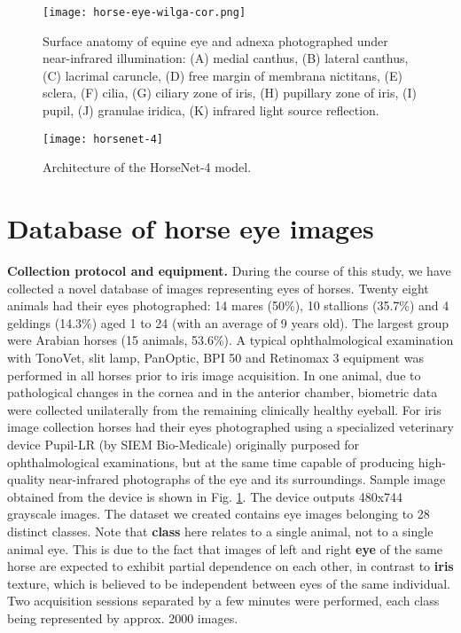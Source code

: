 \documentclass[10pt,twocolumn,letterpaper]{article}
\begin{document}
\begin{figure}[!htb]
\centering
\texttt{[image: horse-eye-wilga-cor.png]}
\vskip0.2cm
\caption{Surface anatomy of equine eye and adnexa photographed under near-infrared illumination: (A) medial canthus, (B) lateral canthus, (C) lacrimal caruncle, (D) free margin of membrana nictitans, (E) sclera, (F) cilia, (G) ciliary zone of iris, (H) pupillary zone of iris, (I) pupil, (J) granulae iridica, (K) infrared light source reflection.}
\label{fig:horse-eye}
\end{figure}

\begin{figure}[!h]
\centering
\texttt{[image: horsenet-4]}
\vskip0.2cm
\caption{Architecture of the HorseNet-4 model.}
\label{fig:architecture-4}
\end{figure}

\section{Database of horse eye images}
\label{sec:Database}
\textbf{Collection protocol and equipment.} During the course of this study, we have collected a novel database of images representing eyes of horses. Twenty eight animals had their eyes photographed: 14 mares (50\%), 10 stallions (35.7\%) and 4 geldings (14.3\%) aged 1 to 24 (with an average of 9 years old). The largest group were Arabian horses (15 animals, 53.6\%). A typical ophthalmological examination with TonoVet, slit lamp, PanOptic, BPI 50 and Retinomax 3 equipment was performed in all horses prior to iris image acquisition. In one animal, due to pathological changes in the cornea and in the anterior chamber, biometric data were collected unilaterally from the remaining clinically healthy eyeball. For iris image collection horses had their eyes photographed using a specialized veterinary device Pupil-LR (by SIEM Bio-Medicale) originally purposed for ophthalmological examinations, but at the same time capable of producing high-quality near-infrared photographs of the eye and its surroundings. Sample image obtained from the device is shown in Fig. \ref{fig:horse-eye}. The device outputs 480x744 grayscale images. The dataset we created contains eye images belonging to 28 distinct classes. Note that \textbf{class} here relates to a single animal, not to a single animal eye. This is due to the fact that images of left and right \textbf{eye} of the same horse are expected to exhibit partial dependence on each other, in contrast to \textbf{iris} texture, which is believed to be independent between eyes of the same individual. Two acquisition sessions separated by a few minutes were performed, each class being represented by approx. 2000 images.
\end{document}
